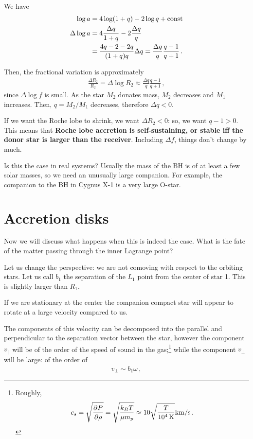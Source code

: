 \documentclass[main.tex]{subfiles}
\begin{document}
We have 
%
\begin{align}
\log a &= 4 \log (1 +q) - 2 \log q + \text{const} \\
\Delta \log a &= 4 \frac{\Delta q}{1 + q} - 2 \frac{\Delta q}{q }  \\
&= \frac{4q -2 -2 q}{(1 + q) q} \Delta q = \frac{\Delta q}{q} \frac{q -1}{q +1}
\,.
\end{align}

Then, the fractional variation is approximately 
%
\begin{align}
\frac{\Delta R_2}{R_2} = \Delta \log R_2 \approx 
\frac{\Delta q}{q} \frac{q -1}{q +1}
\,,
\end{align}
%
since \(\Delta \log f\) is small. As the star \(M_2 \) donates mass, \(M_2 \) decreases and \(M_1 \) increases. Then, \(q = M_2 / M_1 \) decreases, therefore \(\Delta q < 0\). 

If we want the Roche lobe to shrink, we want \(\Delta R_2 < 0\): so, we want \(q - 1 > 0\). 
This means that \textbf{Roche lobe accretion is self-sustaining, or stable iff the donor star is larger than the receiver}. 
Including \(\Delta f\), things don't change by much. 

Is this the case in real systems? Usually the mass of the BH is of at least a few solar masses, so we need an unusually large companion. 
For example, the companion to the BH in Cygnus X-1 is a very large O-star. 

\section{Accretion disks}

Now we will discuss what happens when this is indeed the case. What is the fate of the matter passing through the inner Lagrange point? 

Let us change the perspective: we are not comoving with respect to the orbiting stars. 
Let us call \(b_1 \) the separation of the \(L_1 \) point from the center of star 1. This is slightly larger than \(R_1 \). 

If we are stationary at the center the companion compact star will appear to rotate at a large velocity compared to us. 

The components of this velocity can be decomposed into the parallel and perpendicular to the separation vector between the star, however the component \(v _ \parallel\) will be of the order of the speed of sound in the gas;\footnote{
Roughly, 
%
\begin{align}
c_s = \sqrt{ \pdv{P}{\rho }} = \sqrt{\frac{k_B T}{\mu m_p}} \approx \num{10} \sqrt{ \frac{T}{\SI{e4}{K}}} \SI{}{km /s}
\,.
\end{align}
%
} while the component \(v_\perp\) will be large: of the order of 
%
\begin{align}
v_\perp \sim b_1 \omega 
\,,
\end{align}
%
\end{document}
